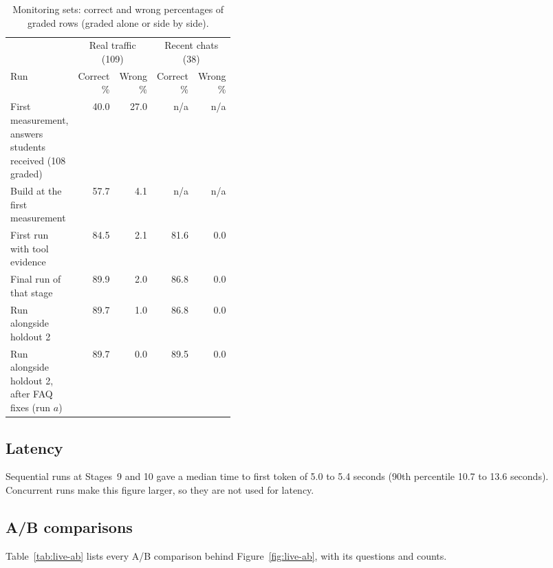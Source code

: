 \begin{table}[htbp]
\centering
\caption{Monitoring sets: correct and wrong percentages of graded rows (graded alone or side by side).}
\label{tab:live-traffic}
\small
\begin{tabular}{@{}>{\raggedright\arraybackslash}p{0.38\linewidth}rrrr@{}}
\toprule
 & \multicolumn{2}{c}{Real traffic (109)} & \multicolumn{2}{c}{Recent chats (38)} \\
Run & Correct \% & Wrong \% & Correct \% & Wrong \% \\
\midrule
First measurement, answers students received (108 graded) & 40.0 & 27.0 & n/a & n/a \\
Build at the first measurement & 57.7 & 4.1 & n/a & n/a \\
First run with tool evidence & 84.5 & 2.1 & 81.6 & 0.0 \\
Final run of that stage & 89.9 & 2.0 & 86.8 & 0.0 \\
Run alongside holdout 2 & 89.7 & 1.0 & 86.8 & 0.0 \\
Run alongside holdout 2, after FAQ fixes (run $a$) & 89.7 & 0.0 & 89.5 & 0.0 \\
\bottomrule
\end{tabular}
\end{table}

\subsection{Latency}
\label{app:live-latency}

Sequential runs at Stages~9 and 10 gave a median time to first token of 5.0 to 5.4 seconds (90th percentile 10.7 to 13.6 seconds). Concurrent runs make this figure larger, so they are not used for latency.

\subsection{A/B comparisons}
\label{app:live-ab}

Table~\ref{tab:live-ab} lists every A/B comparison behind Figure~\ref{fig:live-ab}, with its questions and counts.

